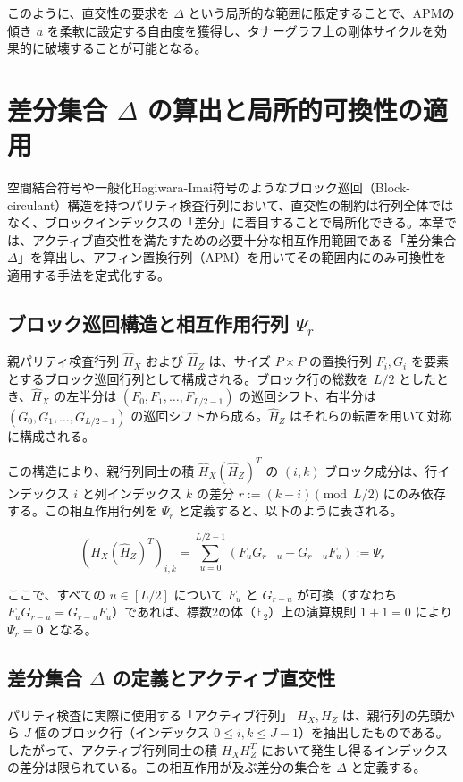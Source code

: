 \documentclass[12pt]{article}
\begin{document}
このように、直交性の要求を $\Delta$ という局所的な範囲に限定することで、APMの傾き $a$ を柔軟に設定する自由度を獲得し、タナーグラフ上の剛体サイクルを効果的に破壊することが可能となる。

\section{差分集合 $\Delta$ の算出と局所的可換性の適用}

空間結合符号や一般化Hagiwara-Imai符号のようなブロック巡回（Block-circulant）構造を持つパリティ検査行列において、直交性の制約は行列全体ではなく、ブロックインデックスの「差分」に着目することで局所化できる。本章では、アクティブ直交性を満たすための必要十分な相互作用範囲である「差分集合 $\Delta$」を算出し、アフィン置換行列（APM）を用いてその範囲内にのみ可換性を適用する手法を定式化する。

\subsection{ブロック巡回構造と相互作用行列 $\Psi_r$}
親パリティ検査行列 $\hat{H}_X$ および $\hat{H}_Z$ は、サイズ $P \times P$ の置換行列 $F_i, G_i$ を要素とするブロック巡回行列として構成される。ブロック行の総数を $L/2$ としたとき、$\hat{H}_X$ の左半分は $(F_0, F_1, \dots, F_{L/2-1})$ の巡回シフト、右半分は $(G_0, G_1, \dots, G_{L/2-1})$ の巡回シフトから成る。$\hat{H}_Z$ はそれらの転置を用いて対称に構成される。

この構造により、親行列同士の積 $\hat{H}_X (\hat{H}_Z)^T$ の $(i, k)$ ブロック成分は、行インデックス $i$ と列インデックス $k$ の差分 $r := (k - i) \pmod{L/2}$ にのみ依存する。この相互作用行列を $\Psi_r$ と定義すると、以下のように表される。

\begin{equation}
    (\hat{H}_X (\hat{H}_Z)^T)_{i,k} = \sum_{u=0}^{L/2-1} \left( F_u G_{r-u} + G_{r-u} F_u \right) := \Psi_r
\end{equation}

ここで、すべての $u \in [L/2]$ について $F_u$ と $G_{r-u}$ が可換（すなわち $F_u G_{r-u} = G_{r-u} F_u$）であれば、標数2の体（$\mathbb{F}_2$）上の演算規則 $1+1=0$ により $\Psi_r = \mathbf{0}$ となる。

\subsection{差分集合 $\Delta$ の定義とアクティブ直交性}
パリティ検査に実際に使用する「アクティブ行列」 $H_X, H_Z$ は、親行列の先頭から $J$ 個のブロック行（インデックス $0 \le i, k \le J-1$）を抽出したものである。したがって、アクティブ行列同士の積 $H_X H_Z^T$ において発生し得るインデックスの差分は限られている。この相互作用が及ぶ差分の集合を $\Delta$ と定義する。
\end{document}
